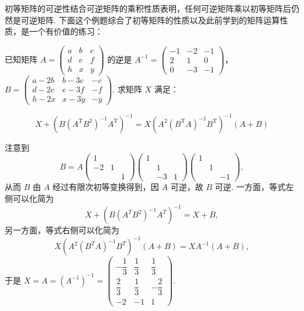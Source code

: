初等矩阵的可逆性结合可逆矩阵的乘积性质表明，任何可逆矩阵乘以初等矩阵后仍然是可逆矩阵. 下面这个例题综合了初等矩阵的性质以及此前学到的矩阵运算性质，是一个有价值的练习：
\begin{example}{}{}
    已知矩阵 $A=\begin{pmatrix}a & b & c \\ d & e & f \\ h & x & y\end{pmatrix}$ 的逆是 $A^{-1}=\begin{pmatrix}-1 & -2 & -1 \\ 2 & 1 & 0 \\ 0 & -3 & -1\end{pmatrix}$，\\
    $B=\begin{pmatrix}a-2b & b-3c & -c \\ d-2e & e-3f & -f \\ h-2x & x-3y & -y\end{pmatrix}$. 求矩阵 $X$ 满足：

    \[X+\left(B(A^\mathrm{T}B^2)^{-1}A^\mathrm{T}\right)^{-1}=X\left(A^2(B^\mathrm{T}A)^{-1}B^\mathrm{T}\right)^{-1}(A+B)\]
\end{example}

\begin{solution}
    注意到
    \[B=A\begin{pmatrix}
            1 &  & \\ -2 & 1 & \\ & & 1
        \end{pmatrix} \begin{pmatrix}
            1 &  & \\ & 1 & \\ & -3 & 1
        \end{pmatrix} \begin{pmatrix}
            1 &  & \\ & 1 & \\ & & -1
        \end{pmatrix},\]
    从而 $B$ 由 $A$ 经过有限次初等变换得到，因 $A$ 可逆，故 $B$ 可逆. 一方面，等式左侧可以化简为
    \[X + \left(B\left(A^{T} B^{2}\right)^{-1} A^{T}\right)^{-1} = X + B,\]
    另一方面，等式右侧可以化简为
    \[X\left(A^{2}\left(B^{T} A\right)^{-1} B^{T}\right)^{-1}(A + B) = X A^{-1}(A + B),\]
    于是 $X = A = (A^{-1})^{-1} = \begin{pmatrix}
            -\dfrac{1}{3} & \dfrac{1}{3} & \dfrac{1}{3}  \\
            \dfrac{2}{3}  & \dfrac{1}{3} & -\dfrac{2}{3} \\
            -2           & -1          & 1
        \end{pmatrix}$.
\end{solution}

